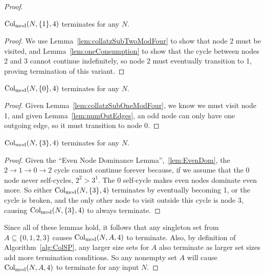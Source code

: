 \begin{proof}
\begin{lemma}
\label{lem:collatzSubOneModFour}
$\mathrm{Col}_{\text{mod}}(N,\{1\},4)$ terminates for any $N$.
\end{lemma}
\begin{proof}
We use Lemma~\ref{lem:collatzSubTwoModFour} to show that node 2 must be visited, and Lemma~\ref{lem:oneConsumption} to show that the cycle between nodes 2 and 3 cannot continue indefinitely, so node 2 must eventually transition to 1, proving termination of this variant.
\end{proof}
\begin{lemma}
\label{lem:collatzSubZeroModFour}
$\mathrm{Col}_{\text{mod}}(N,\{0\},4)$ terminates for any $N$.
\end{lemma}
\begin{proof}
Given Lemma~\ref{lem:collatzSubOneModFour}, we know we must visit node 1, and given Lemma~\ref{lem:numOutEdges}, an odd node can only have one outgoing edge, so it must transition to node 0.
\end{proof}
\begin{lemma}
\label{lem:collatzSubThreeModFour}
$\mathrm{Col}_{\text{mod}}(N,\{3\},4)$ terminates for any $N$.
\end{lemma}
\begin{proof}
Given the ``Even Node Dominance Lemma'',~\ref{lem:EvenDom}, the $2 \rightarrow 1 \rightarrow 0 \rightarrow 2$ cycle cannot continue forever because, if we assume that the 0 node never self-cycles, $2^2 > 3^1$. The 0 self-cycle makes even nodes dominate even more. So either $\mathrm{Col}_{\text{mod}}(N,\{3\},4)$ terminates by eventually becoming 1, or the cycle is broken, and the only other node to visit outside this cycle is node 3,  causing $\mathrm{Col}_{\text{mod}}(N,\{3\},4)$ to always terminate.
\end{proof}
Since all of these lemmas hold, it follows that any singleton set from $A \subseteq \{0,1,2,3\}$ causes $\mathrm{Col}_{\text{mod}}(N,A,4)$ to terminate. Also, by definition of Algorithm~\ref{alg:ColSP}, any larger size sets for $A$ also terminate as larger set sizes add more termination conditions. So any nonempty set $A$ will cause $\mathrm{Col}_{\text{mod}}(N,A,4)$ to terminate for any input $N$.
\end{proof}
